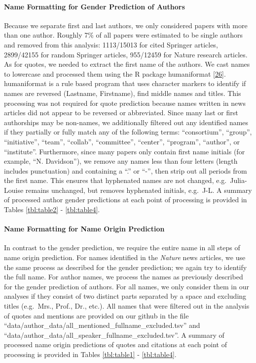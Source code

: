 \hypertarget{name-formatting-for-gender-prediction-of-authors}{%
\paragraph{Name Formatting for Gender Prediction of Authors}\label{name-formatting-for-gender-prediction-of-authors}}

Because we separate first and last authors, we only considered papers with more than one author.
Roughly 7\% of all papers were estimated to be single authors and removed from this analysis: 1113/15013 for cited Springer articles, 2899/42155 for random Springer articles, 955/12459 for Nature research articles.
As for quotes, we needed to extract the first name of the authors.
We cast names to lowercase and processed them using the R package humaniformat {[}\protect\hyperlink{ref-dJT5FREG}{26}{]}.
humaniformat is a rule based program that uses character markers to identify if names are reversed (Lastname, Firstname), find middle names and titles.
This processing was not required for quote prediction because names written in news articles did not appear to be reversed or abbreviated.
Since many last or first authorships may be non-names, we additionally filtered out any identified names if they partially or fully match any of the following terms: ``consortium'', ``group'', ``initiative'', ``team'', ``collab'', ``committee'', ``center'', ``program'', ``author'', or ``institute''.
Furthermore, since many papers only contain first name initials (for example, ``N. Davidson''), we remove any names less than four letters (length includes punctuation) and containing a ``.'' or ``-'', then strip out all periods from the first name.
This ensures that hyphenated names are not changed, e.g.~Julia-Louise remains unchanged, but removes hyphenated initials, e.g.~J-L.
A summary of processed author gender predictions at each point of processing is provided in Tables \ref{tbl:table2} - \ref{tbl:table4}.

\hypertarget{name-formatting-for-name-origin-prediction}{%
\paragraph{Name Formatting for Name Origin Prediction}\label{name-formatting-for-name-origin-prediction}}

In contrast to the gender prediction, we require the entire name in all steps of name origin prediction.
For names identified in the \emph{Nature} news articles, we use the same process as described for the gender prediction; we again try to identify the full name.
For author names, we process the names as previously described for the gender prediction of authors.
For all names, we only consider them in our analyses if they consist of two distinct parts separated by a space and excluding titles (e.g.~Mrs., Prof., Dr., etc.).
All names that were filtered out in the analysis of quotes and mentions are provided on our github in the file ``data/author\_data/all\_mentioned\_fullname\_excluded.tsv'' and ``data/author\_data/all\_speaker\_fullname\_excluded.tsv''.
A summary of processed name origin predictions of quotes and citations at each point of processing is provided in Tables \ref{tbl:table1} - \ref{tbl:table4}.

